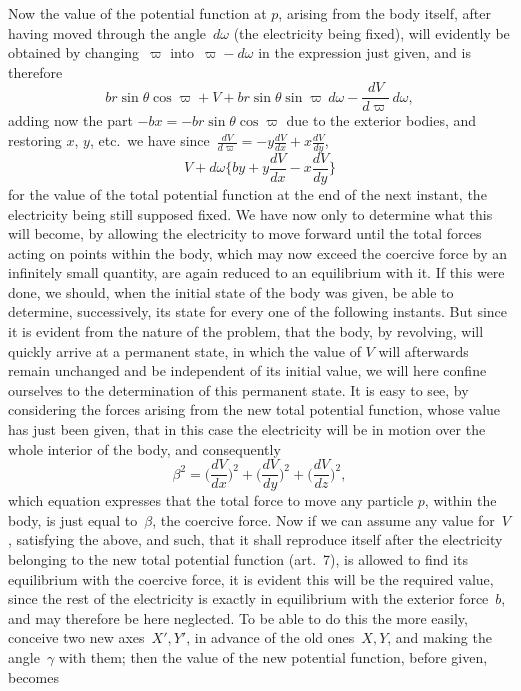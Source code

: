 \documentclass[12pt,notitlepage]{amsart}
\begin{document}
Now the value of the potential function at $p$, arising from the body
itself, after having moved through the angle~$d\omega$
(the electricity being fixed),
will evidently be obtained by changing~$\varpi$
into~$\varpi-d\omega$ in the expression just
given, and is therefore
\[
br\sin\theta\cos\varpi+V+br\sin\theta\sin\varpi\,d\omega
-\frac{dV}{d\varpi}\,d\omega,
\]
adding now the part $-bx=-br\sin\theta\cos\varpi$
due to the exterior bodies, and
restoring $x$, $y$, etc.\ we have
since~$\frac{dV}{d\varpi}=-y\frac{dV}{dx}+x\frac{dV}{dy}$,
\[
V+d\omega\biggl\{
  by+y\frac{dV}{dx}-x\frac{dV}{dy}
\biggr\}
\]
for the value of the total potential function at the end of the next instant,
the electricity being still supposed fixed. We have now only to determine
what this will become, by allowing the electricity to move forward until the
total forces acting on points within the body, which may now exceed the
coercive force by an infinitely small quantity, are again reduced to an 
equilibrium with it. If this were done, we should, when the initial state of the
body was given, be able to determine, successively, its state for every one of
the following instants. But since it is evident from the nature of the problem,
that the body, by revolving, will quickly arrive at a permanent state, in
which the value of $V$ will afterwards remain unchanged and be independent
of its initial value,
we will here confine ourselves to the determination of this
permanent state. It is easy to see, by considering the forces arising from
the new total potential function, whose value has just been given, that in this
case the electricity will be in motion over the whole interior of the body, and
consequently
\[
\beta^2=
\biggl(\frac{dV}{dx}\biggr)^2
+\biggl(\frac{dV}{dy}\biggr)^2
+\biggl(\frac{dV}{dz}\biggr)^2,
\]
which equation expresses that the total force to move any particle $p$, within
the body, is just equal to~$\beta$, the coercive force. Now if we can assume any
value for~$V$, satisfying the above,
and such, that it shall reproduce itself after
the electricity belonging to the new total potential function (art.~7),
is allowed
to find its equilibrium with the coercive force, it is evident this will be the
required value, since the rest of the electricity is exactly in equilibrium with
the exterior force~$b$, and may therefore be here neglected. To be able to
do this the more easily, conceive two new axes~$X',Y'$, in advance of the
old ones~$X,Y$, and making the angle~$\gamma$ with them; then the value of the
new potential function, before given, becomes
\end{document}
